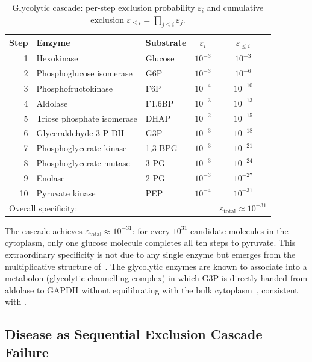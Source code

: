 \begin{table}[htbp]
\centering
\caption{Glycolytic cascade: per-step exclusion probability $\varepsilon_i$
         and cumulative exclusion $\varepsilon_{\leq i}=\prod_{j\leq i}\varepsilon_j$.}
\label{tab:ch03-glycolysis}
\begin{tabular}{rllcc}
\hline
Step & Enzyme & Substrate & $\varepsilon_i$ & $\varepsilon_{\leq i}$ \\
\hline
 1 & Hexokinase           & Glucose       & $10^{-3}$ & $10^{-3}$ \\
 2 & Phosphoglucose isomerase & G6P      & $10^{-3}$ & $10^{-6}$ \\
 3 & Phosphofructokinase  & F6P           & $10^{-4}$ & $10^{-10}$ \\
 4 & Aldolase             & F1,6BP        & $10^{-3}$ & $10^{-13}$ \\
 5 & Triose phosphate isomerase & DHAP   & $10^{-2}$ & $10^{-15}$ \\
 6 & Glyceraldehyde-3-P DH & G3P         & $10^{-3}$ & $10^{-18}$ \\
 7 & Phosphoglycerate kinase & 1,3-BPG   & $10^{-3}$ & $10^{-21}$ \\
 8 & Phosphoglycerate mutase & 3-PG      & $10^{-3}$ & $10^{-24}$ \\
 9 & Enolase              & 2-PG          & $10^{-3}$ & $10^{-27}$ \\
10 & Pyruvate kinase      & PEP           & $10^{-4}$ & $10^{-31}$ \\
\hline
\multicolumn{4}{l}{Overall specificity:} & $\varepsilon_{\mathrm{total}}\approx 10^{-31}$ \\
\hline
\end{tabular}
\end{table}

The cascade achieves $\varepsilon_{\mathrm{total}}\approx 10^{-31}$: for every
$10^{31}$ candidate molecules in the cytoplasm, only one glucose molecule
completes all ten steps to pyruvate.  This extraordinary specificity is not
due to any single enzyme but emerges from the multiplicative structure
of~.  The glycolytic enzymes are known to associate
into a metabolon (glycolytic channelling complex) in which G3P is directly
handed from aldolase to GAPDH without equilibrating with the bulk
cytoplasm~\citep{nelson2008lehninger}, consistent with
.

\subsection{Disease as Sequential Exclusion Cascade Failure}

